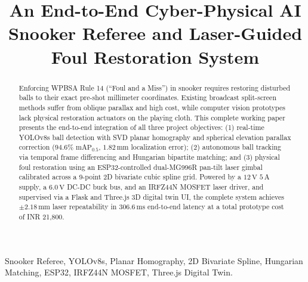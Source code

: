 \documentclass[conference]{IEEEtran}
\begin{document}
\title{An End-to-End Cyber-Physical AI Snooker Referee and Laser-Guided Foul Restoration System}

\author{
}

\maketitle

\begin{abstract}
Enforcing WPBSA Rule 14 (``Foul and a Miss'') in snooker requires restoring disturbed balls to their exact pre-shot millimeter coordinates. Existing broadcast split-screen methods suffer from oblique parallax and high cost, while computer vision prototypes lack physical restoration actuators on the playing cloth. This complete working paper presents the end-to-end integration of all three project objectives: (1) real-time YOLOv8s ball detection with SVD planar homography and spherical elevation parallax correction ($94.6\%$ $\text{mAP}_{0.5}$, $1.82\,\text{mm}$ localization error); (2) autonomous ball tracking via temporal frame differencing and Hungarian bipartite matching; and (3) physical foul restoration using an ESP32-controlled dual-MG996R pan-tilt laser gimbal calibrated across a 9-point 2D bivariate cubic spline grid. Powered by a $12\,\text{V}$ $5\,\text{A}$ supply, a $6.0\,\text{V}$ DC-DC buck bus, and an IRFZ44N MOSFET laser driver, and supervised via a Flask and Three.js 3D digital twin UI, the complete system achieves $\pm 2.18\,\text{mm}$ laser repeatability in $306.6\,\text{ms}$ end-to-end latency at a total prototype cost of INR 21,800.
\end{abstract}

\begin{IEEEkeywords}
Snooker Referee, YOLOv8s, Planar Homography, 2D Bivariate Spline, Hungarian Matching, ESP32, IRFZ44N MOSFET, Three.js Digital Twin.
\end{IEEEkeywords}
\end{document}

